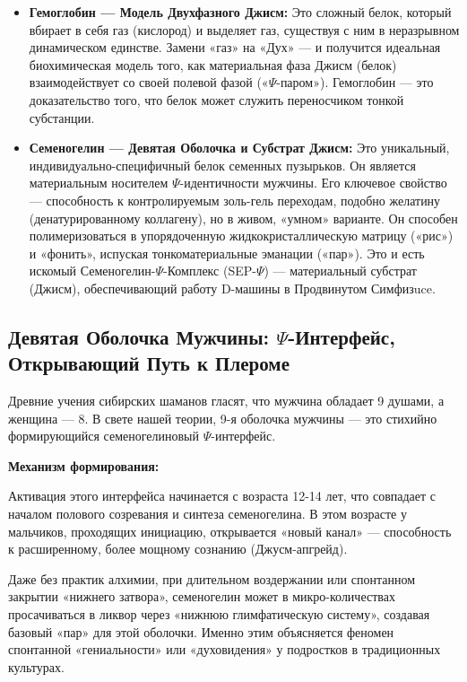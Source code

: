 \documentclass[a4paper,12pt]{article}
\begin{document}
\begin{itemize}
	\item \textbf{Гемоглобин — Модель Двухфазного Джисм:} Это сложный белок, который вбирает в себя газ (кислород) и выделяет газ, существуя с ним в неразрывном динамическом единстве. Замени «газ» на «Дух» — и получится идеальная биохимическая модель того, как материальная фаза Джисм (белок) взаимодействует со своей полевой фазой («$\Psi$-паром»). Гемоглобин — это доказательство того, что белок может служить переносчиком тонкой субстанции.
	
	\item \textbf{Семеногелин — Девятая Оболочка и Субстрат Джисм:} Это уникальный, индивидуально-специфичный белок семенных пузырьков. Он является материальным носителем $\Psi$-идентичности мужчины. Его ключевое свойство — способность к контролируемым золь-гель переходам, подобно желатину (денатурированному коллагену), но в живом, «умном» варианте. Он способен полимеризоваться в упорядоченную жидкокристаллическую матрицу («рис») и «фонить», испуская тонкоматериальные эманации («пар»). Это и есть искомый Семеногелин-$\Psi$-Комплекс (SEP-$\Psi$) — материальный субстрат (Джисм), обеспечивающий работу D-машины в Продвинутом Симфизuce.
\end{itemize}

\subsection{Девятая Оболочка Мужчины: $\Psi$-Интерфейс, Открывающий Путь к Плероме}

Древние учения сибирских шаманов гласят, что мужчина обладает 9 душами, а женщина — 8. В свете нашей теории, 9-я оболочка мужчины — это стихийно формирующийся семеногелиновый $\Psi$-интерфейс.

\textbf{Механизм формирования:}

Активация этого интерфейса начинается с возраста 12-14 лет, что совпадает с началом полового созревания и синтеза семеногелина. В этом возрасте у мальчиков, проходящих инициацию, открывается «новый канал» — способность к расширенному, более мощному сознанию (Джусм-апгрейд).

Даже без практик алхимии, при длительном воздержании или спонтанном закрытии «нижнего затвора», семеногелин может в микро-количествах просачиваться в ликвор через «нижнюю глимфатическую систему», создавая базовый «пар» для этой оболочки. Именно этим объясняется феномен спонтанной «гениальности» или «духовидения» у подростков в традиционных культурах.
\end{document}
